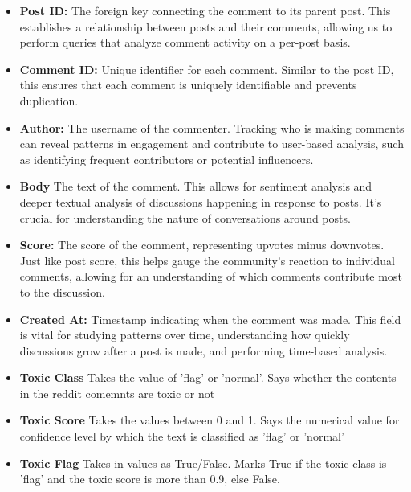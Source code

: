\documentclass[sigconf]{acmart}
\begin{document}
    \begin{itemize}
    
        \item \textbf{Post ID:} The foreign key connecting the comment to its parent post. This establishes a relationship between posts and their comments, allowing us to perform queries that analyze comment activity on a per-post basis.
    
        \item \textbf{Comment ID:} Unique identifier for each comment. Similar to the post ID, this ensures that each comment is uniquely identifiable and prevents duplication.
        
        \item \textbf{Author:} The username of the commenter. Tracking who is making comments can reveal patterns in engagement and contribute to user-based analysis, such as identifying frequent contributors or potential influencers.
        
        \item \textbf{Body} The text of the comment. This allows for sentiment analysis and deeper textual analysis of discussions happening in response to posts. It’s crucial for understanding the nature of conversations around posts.
        
        \item \textbf{Score:} The score of the comment, representing upvotes minus downvotes. Just like post score, this helps gauge the community's reaction to individual comments, allowing for an understanding of which comments contribute most to the discussion.
        
        \item \textbf{Created At:} Timestamp indicating when the comment was made. This field is vital for studying patterns over time, understanding how quickly discussions grow after a post is made, and performing time-based analysis.

        \item \textbf{Toxic Class} Takes the value of 'flag' or 'normal'. Says whether the contents in the reddit comemnts are toxic or not

        \item \textbf{Toxic Score} Takes the values between 0 and 1. Says the numerical value for confidence level by which the text is classified as 'flag' or 'normal'

        \item \textbf{Toxic Flag} Takes in values as True/False. Marks True if the toxic class is 'flag' and the toxic score is more than 0.9, else False.

    \end{itemize}
\end{document}
